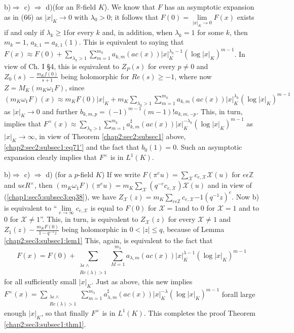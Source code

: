b)$\Rightarrow$ c) $\Rightarrow$ d)(for an $\mathbb{R}$-field $K$). We
know that $F$ has an asymptotic expansion as in (66) as
$|x|_{K}\rightarrow 0$ with $\lambda_{0}>0$; it follows that
$F(0)=\lim\limits_{|x|_{K}\rightarrow 0}F(x)$ exists if and only if
$\lambda_{k}\ge 1$\pageoriginale for every $k$ and, in addition, when
$\lambda_{k}=1$ for some $k$, then $m_{k}=1$,
$a_{k,1}=a_{k,1}(1)$. This is equivalent to saying that
$F(x)\approx F(0)+\sum\limits_{\lambda_{k}>1}
\sum\limits_{m=1}^{m_{k}} a_{k,m}(ac(x))|x|_{K}^{\lambda_{k}-1}(\log
|x|_{K})^{m-1}$. In view of Ch. I \S 4, this is equivalent to
$Z_{P}(s)$ for every $p\neq 0$ and $Z_{0}(s)-\frac{m_{K}{f(0)}}{s+1}$
being holomorphic for $Re(s)\ge -1$, where now
$Z=M_{K}(m_{K}\omega_{1}F)$, since $(m_{K}\omega_{1}F)(x)\approx
m_{K}F(0)|x|_{K}+m_{K}\sum\limits_{\lambda_{k}>1}\sum\limits_{m=1}^{m_{k}}
a_{k,m}(ac(x))|x|_{K}^{\lambda_{k}}(\log|x|_{K})^{m-1}$
as $|x|_{K}\rightarrow 0$ and further $b_{k,m,p}=(-1)^{m-1}(m-1)!a_{k,
  m, -p}$. This, in turn, implies that $F^{\times}(x)\approx
\sum\limits_{\lambda_{k}>1}\sum\limits_{m=1}^{m_{k}}a_{k,
  m}^{\sharp}(ac(x))|x|_{K}^{-\lambda_{k}}(\log |x|_{K})^{m-1}$ as
$|x|_{K}\rightarrow \infty$, in view of Theorem
\ref{chap2:sec2:subsec1} above, \ref{chap2:sec2:subsec1:eq71'} 
and the fact that $b_{0}(1)=0$. Such an asymptotic expansion clearly
implies that $F^{\times}$ is in $L^{1}(K)$. 

b)$\Rightarrow$ c) $\Rightarrow$ d) (for a $p$-field $K$) If we write
$F(\pi^{e}u)=\sum\limits_{\mathcal{X}}c_{e,
  \mathcal{X}}\mathcal{X}(u)$ for $e\epsilon \mathbb{Z}$ and $u
\epsilon R^{\times}$, then
$(m_{K}\omega_{1}F)(\pi^{e}u)=m_{K}\sum\limits_{\mathcal{X}}(q^{-e}c_{e,\mathcal{X}})
\mathcal{X}(u)$ and in view of (\ref{chap1:sec5:subsec3:eq38}), we have
$Z_{\mathcal{X}}(z)=m_{K}\sum\limits_{e\epsilon
  \mathbb{Z}}c_{e,\mathcal{X}}{-1}(q^{-1}z)^{e}$. Now b) is
  equivalent to ``$\lim\limits_{e \rightarrow \infty}c_{e,
    \mathcal{X}}$ is equal to $F(0)$ for $\mathcal{X}=1$and to $0$ for
  $\mathcal {X}=1$ and to $0$ for $\mathcal{X}\neq 1$''. This, in
  turn, is equivalent to $Z_{\mathcal{X}}(z)$ for every $\mathcal{X}
  \neq 1$ and $Z_{1}(z)-\frac{m_{K}F(0)}{1-q^{-1}z}$ being holomorphic
  in $0<|z|\le q$, because of Lemma \ref{chap2:sec3:subsec1:lem1} This, again, is equivalent
  to the fact that 
\begin{equation*}
  F(x)=F(0)+\sum\limits_{\substack {\lambda \epsilon
      \wedge\\ Re(\lambda)>1}}\sum\limits_{M=1}^{m_{\lambda}}a_{\lambda,m}
  (ac(x))|x|_{K}^{\lambda-1} (\log|x|_{K})^{m-1}
\end{equation*}
for all sufficiently small $|x|_{K}$. Just as above, this new implies
$F^{\times}(x)= \sum\limits_{\substack {\lambda \epsilon
    \wedge\\ Re(\lambda)>1}}\sum\limits_{m=1}^{m_{\lambda}}a^{\sharp}_{\lambda,
  m}(ac(x))|x|_{K}^{-\lambda}(\log|x|_{K})^{m-1}$ for\pageoriginale all large enough
$|x|_{K}$, so that finally $F^{\times}$ is in $L^{1}(K)$. This completes
the proof Theorem \ref{chap2:sec3:subsec1:thm1}.

